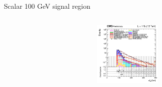 \documentclass[8pt]{beamer}
\begin{document}
\begin{frame}{Scalar 100 GeV signal region}
\begin{columns}
		\begin{column}{0.33\textwidth}
			\begin{center}
     			\includegraphics[width=1.0\textwidth, height=90pt]{figs/2018/log_cratio_topCR_ll_DNN_signal0_scalar100_mt2ll.png}
    		\end{center}		
		\end{column}
\end{columns} \vfill
\end{frame}
\end{document}
